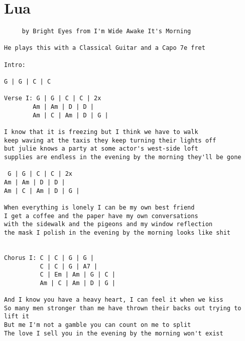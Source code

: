\documentclass[leqno]{memoir}
\begin{document}
\chapter{Lua}
\begin{verbatim}
     by Bright Eyes from I'm Wide Awake It's Morning 

He plays this with a Classical Guitar and a Capo 7e fret

Intro: 

G | G | C | C 

Verse I: G | G | C | C | 2x
        Am | Am | D | D |
        Am | C | Am | D | G |
                             
I know that it is freezing but I think we have to walk 
keep waving at the taxis they keep turning their lights off 
but julie knows a party at some actor's west-side loft
supplies are endless in the evening by the morning they'll be gone

 G | G | C | C | 2x
Am | Am | D | D |
Am | C | Am | D | G |

When everything is lonely I can be my own best friend
I get a coffee and the paper have my own conversations
with the sidewalk and the pigeons and my window reflection
the mask I polish in the evening by the morning looks like shit


Chorus I: C | C | G | G |
          C | C | G | A7 |
          C | Em | Am | G | C |
          Am | C | Am | D | G |

And I know you have a heavy heart, I can feel it when we kiss 
So many men stronger than me have thrown their backs out trying to lift it
But me I'm not a gamble you can count on me to split 
The love I sell you in the evening by the morning won't exist

\end{verbatim}
\newpage
\end{document}
